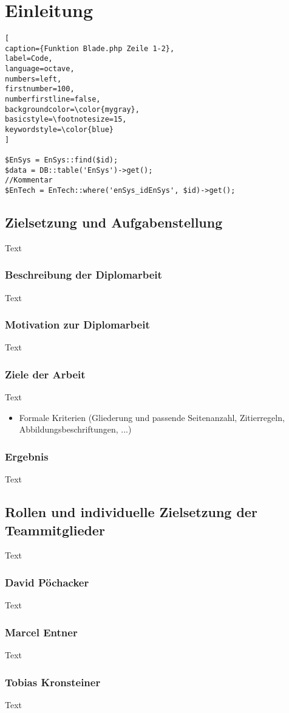 \chapter{Einleitung}
\renewcommand{\lstlistingname}{Quellcode}

\begin{lstlisting}[
caption={Funktion Blade.php Zeile 1-2},
label=Code,
language=octave,
numbers=left,
firstnumber=100,
numberfirstline=false,
backgroundcolor=\color{mygray},
basicstyle=\footnotesize=15,
keywordstyle=\color{blue}
]

$EnSys = EnSys::find($id);
$data = DB::table('EnSys')->get();
//Kommentar
$EnTech = EnTech::where('enSys_idEnSys', $id)->get();
\end{lstlisting}


\section{Zielsetzung und Aufgabenstellung}
Text


\subsection{Beschreibung der Diplomarbeit}
Text
 
\subsection{Motivation zur Diplomarbeit}
Text


\subsection{Ziele der Arbeit}
Text

\begin{itemize}
 \item Formale Kriterien (Gliederung und passende Seitenanzahl, Zitierregeln, Abbildungsbeschriftungen, ...)
\end{itemize}

\subsection{Ergebnis}
Text

\section{Rollen und individuelle Zielsetzung der Teammitglieder}
Text

\subsection{David Pöchacker}
Text

\subsection{Marcel Entner}
Text

\subsection{Tobias Kronsteiner}
Text


